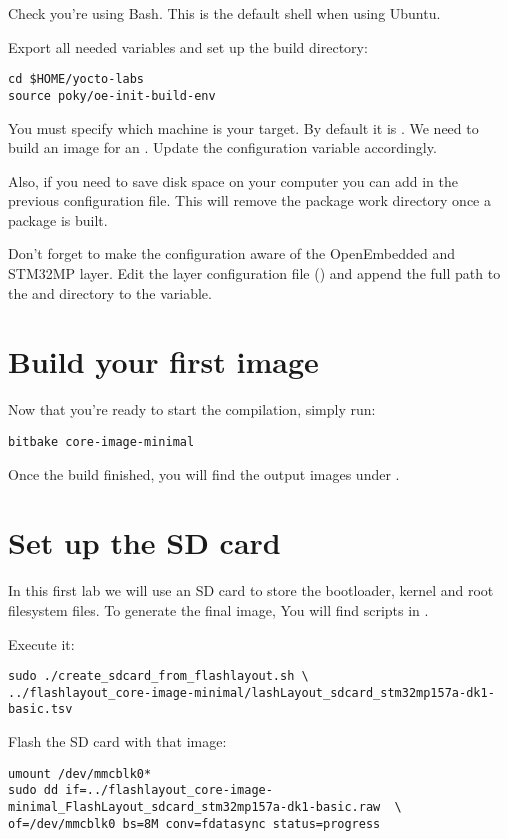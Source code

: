 Check you're using Bash. This is the default shell when using Ubuntu.

Export all needed variables and set up the build directory:
\begin{verbatim}
cd $HOME/yocto-labs
source poky/oe-init-build-env
\end{verbatim}

You must specify which machine is your target. By default it
is . We need to build an image for an .
Update the  configuration variable accordingly.

Also, if you need to save disk space on your computer you can add  in the previous configuration file. This will remove the
package work directory once a package is built.

Don't forget to make the configuration aware of the OpenEmbedded and
STM32MP layer. Edit the layer configuration file
() and append the full path to the
 and  directory to the
 variable.

\section{Build your first image}

Now that you're ready to start the compilation, simply run:
\begin{verbatim}
bitbake core-image-minimal
\end{verbatim}

Once the build finished, you will find the output images under
.

\section{Set up the SD card}

In this first lab we will use an SD card to store the bootloader, kernel and
root filesystem files. To generate the final image, You will find scripts in
.

Execute it:
\begin{verbatim}
sudo ./create_sdcard_from_flashlayout.sh \
../flashlayout_core-image-minimal/lashLayout_sdcard_stm32mp157a-dk1-basic.tsv
\end{verbatim}

Flash the SD card with that image:
\begin{verbatim}
umount /dev/mmcblk0*
sudo dd if=../flashlayout_core-image-minimal_FlashLayout_sdcard_stm32mp157a-dk1-basic.raw  \
of=/dev/mmcblk0 bs=8M conv=fdatasync status=progress
\end{verbatim}

